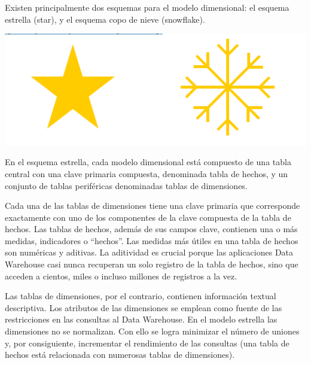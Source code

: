 Existen principalmente dos esquemas para el modelo dimensional: el esquema estrella (star), y el esquema copo de nieve (snowflake).  \newline




\begin{center}
\includegraphics{images/BS/imagen 02.png}\newline
\end{center}


En el esquema estrella, cada modelo dimensional está compuesto de una tabla central con una clave primaria compuesta, denominada tabla de hechos, y un conjunto de tablas periféricas denominadas tablas de dimensiones.  \newline


Cada una de las tablas de dimensiones tiene una clave primaria que corresponde exactamente con uno de los componentes de la clave compuesta de la tabla de hechos. Las tablas de hechos, además de sus campos clave, contienen una o más medidas, indicadores o “hechos”. Las medidas más útiles en una tabla de hechos son numéricas y aditivas. La aditividad es crucial porque las aplicaciones Data Warehouse casi nunca recuperan un solo registro de la tabla de hechos, sino que acceden a cientos, miles o incluso millones de registros a la vez. \newline


Las tablas de dimensiones, por el contrario, contienen información textual descriptiva. Los atributos de las dimensiones se emplean como fuente de las restricciones en las consultas al Data Warehouse. En el modelo estrella las dimensiones no se normalizan. Con ello se logra minimizar el número de uniones y, por consiguiente, incrementar el rendimiento de las consultas (una tabla de hechos está relacionada con numerosas tablas de dimensiones).\newline 


